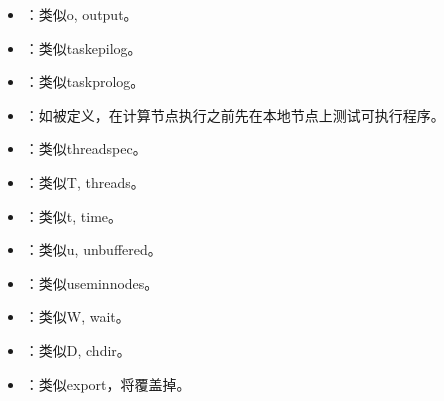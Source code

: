 \documentclass[a4paper,12pt,english]{sphinxmanual}
\begin{document}
\begin{itemize}
\item {} 
\sphinxAtStartPar
{}：类似\sphinxhyphen{}o, \sphinxhyphen{}\sphinxhyphen{}output。

\item {} 
\sphinxAtStartPar
{}：类似\sphinxhyphen{}\sphinxhyphen{}task\sphinxhyphen{}epilog。

\item {} 
\sphinxAtStartPar
{}：类似\sphinxhyphen{}\sphinxhyphen{}task\sphinxhyphen{}prolog。

\item {} 
\sphinxAtStartPar
{}：如被定义，在计算节点执行之前先在本地节点上测试可执行程序。

\item {} 
\sphinxAtStartPar
{}：类似\sphinxhyphen{}\sphinxhyphen{}thread\sphinxhyphen{}spec。

\item {} 
\sphinxAtStartPar
{}：类似\sphinxhyphen{}T, \sphinxhyphen{}\sphinxhyphen{}threads。

\item {} 
\sphinxAtStartPar
{}：类似\sphinxhyphen{}t, \sphinxhyphen{}\sphinxhyphen{}time。

\item {} 
\sphinxAtStartPar
{}：类似\sphinxhyphen{}u, \sphinxhyphen{}\sphinxhyphen{}unbuffered。

\item {} 
\sphinxAtStartPar
{}：类似\sphinxhyphen{}\sphinxhyphen{}use\sphinxhyphen{}min\sphinxhyphen{}nodes。

\item {} 
\sphinxAtStartPar
{}：类似\sphinxhyphen{}W, \sphinxhyphen{}\sphinxhyphen{}wait。

\item {} 
\sphinxAtStartPar
{}：类似\sphinxhyphen{}D, \sphinxhyphen{}\sphinxhyphen{}chdir。

\item {} 
\sphinxAtStartPar
{}：类似\sphinxhyphen{}\sphinxhyphen{}export，将覆盖掉。

\end{itemize}
\end{document}
